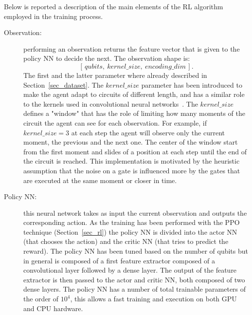 \documentclass[sn-basic]{sn-jnl} %
\begin{document}
\noindent
Below is reported a description of the main elements of the RL algorithm employed in the training process.
\begin{description}
    \item[Observation:] performing an observation returns the feature vector that is given to the policy NN to decide the next. The observation shape is: 
    $$[\,qubits,\: kernel\_size,\: encoding\_dim\,].$$
    The first and the latter parameter where already described in Section~\ref{sec_dataset}. The $kernel\_size$ parameter has been introduced to make the agent adapt to circuits of different length, and has a similar role to the kernels used in convolutional neural networks~\cite{GU2018354}. The $kernel\_size$ defines a "window" that has the role of limiting how many moments of the circuit the agent can see for each observation. For example, if $kernel\_size=3$ at each step the agent will observe only the current moment, the previous and the next one. The center of the window start from the first moment and slides of a position at each step until the end of the circuit is reached. This implementation is motivated by the heuristic assumption that the noise on a gate is influenced more by the gates that are executed at the same moment or closer in time.

    \item[Policy NN:] this neural network takes as input the current observation and outputs the corresponding action. As the training has been performed with the PPO technique (Section~\ref{sec_rl}) the policy NN is divided into the actor NN (that chooses the action) and the critic NN (that tries to predict the reward). The policy NN has been tuned based on the number of qubits but in general is composed of a first feature extractor composed of a convolutional layer followed by a dense layer. The output of the feature extractor is then passed to the actor and critic NN, both composed of two dense layers. The policy NN has a number of total trainable parameters of the order of $10^4$, this allows a fast training and execution on both GPU and CPU hardware.


\end{description}
\end{document}
